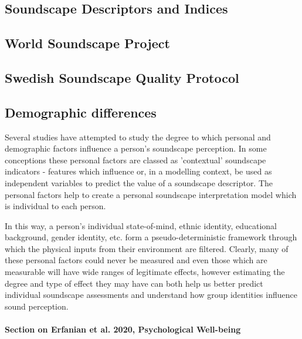 \subsection{Soundscape Descriptors and Indices}

\subsection{World Soundscape Project}

\subsection{Swedish Soundscape Quality Protocol}


\subsection{Demographic differences}
Several studies have attempted to study the degree to which personal and demographic factors influence a person's soundscape perception. In some conceptions  %
these personal factors are classed as 'contextual' soundscape indicators - features which influence or, in a modelling context, be used as independent variables to predict the value of a soundscape descriptor. The personal factors help to create a personal soundscape interpretation model which is individual to each person.

In this way, a person's individual state-of-mind, ethnic identity, educational background, gender identity, etc. form a pseudo-deterministic framework %
through which the physical inputs from their environment are filtered. Clearly, many of these personal factors could never be measured and even those which are measurable will have wide ranges of legitimate effects, however estimating the degree and type of effect they may have can both help us better predict individual soundscape assessments and understand how group identities influence sound perception.


\paragraph*{Section on Erfanian et al. 2020, Psychological Well-being}

